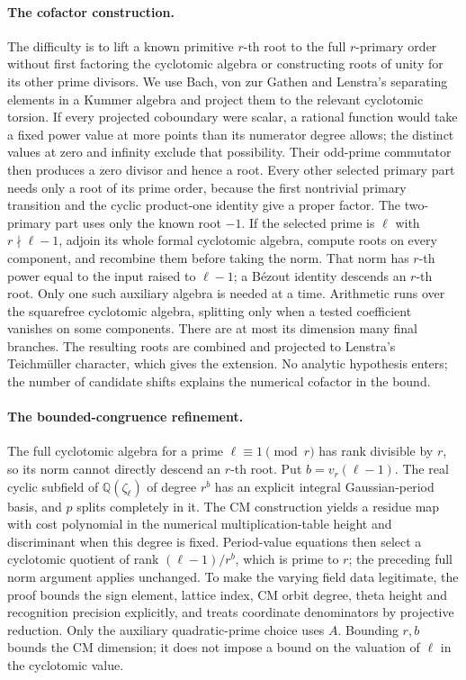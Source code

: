 \documentclass[11pt]{article}
\theoremstyle{definition}
\theoremstyle{remark}
\begin{document}
\paragraph{The cofactor construction.}
The difficulty is to lift a known primitive \(r\)-th root to the full
\(r\)-primary order without first factoring the cyclotomic algebra or
constructing roots of unity for its other prime divisors. We use Bach,
von zur Gathen and Lenstra's separating elements in a Kummer algebra
and project them to the relevant cyclotomic torsion. If every projected
coboundary were scalar, a rational function would take a fixed power
value at more points than its numerator degree allows; the distinct
values at zero and infinity exclude that possibility. Their
odd-prime commutator then produces a zero divisor and hence a root.
Every other selected primary part needs only a root of its prime
order, because the first nontrivial primary transition and the cyclic
product-one identity give a proper factor. The two-primary part uses
only the known root \(-1\). If the selected prime is \(\ell\) with
\(r\nmid\ell-1\), adjoin its whole formal cyclotomic algebra,
compute roots on every component, and recombine them before taking
the norm. That norm has \(r\)-th power equal to the input raised to
\(\ell-1\); a B\'ezout identity descends an \(r\)-th root.
Only one such auxiliary algebra is needed at a time.
Arithmetic runs over the squarefree cyclotomic algebra, splitting
only when a tested coefficient vanishes on some components. There
are at most its dimension many final branches. The resulting roots
are combined and projected to Lenstra's Teichm\"uller character,
which gives the extension. No analytic hypothesis enters; the number
of candidate shifts explains the numerical cofactor in the bound.

\paragraph{The bounded-congruence refinement.}
The full cyclotomic algebra for a prime \(\ell\equiv1\pmod r\)
has rank divisible by \(r\), so its norm cannot directly descend an
\(r\)-th root. Put \(b=v_r(\ell-1)\). The real cyclic subfield of
\(\mathbb Q(\zeta_\ell)\) of degree \(r^b\) has an explicit integral
Gaussian-period basis, and \(p\) splits completely in it. The CM
construction yields a residue map with cost polynomial in the numerical
multiplication-table height and discriminant when this degree is fixed.
Period-value equations then select a cyclotomic quotient of rank
\((\ell-1)/r^b\), which is prime to \(r\); the preceding full norm
argument applies unchanged. To make the varying field data legitimate,
the proof bounds the sign element, lattice index, CM orbit degree,
theta height and recognition precision explicitly, and treats coordinate
denominators by projective reduction. Only the auxiliary quadratic-prime
choice uses \(A\). Bounding \(r,b\) bounds the CM dimension; it does
not impose a bound on the valuation of \(\ell\) in the cyclotomic value.
\end{document}
